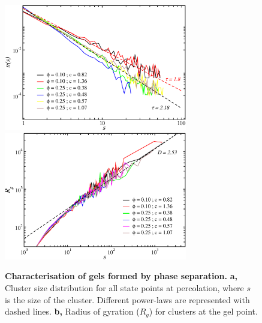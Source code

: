 \documentclass[a4paper,preprint,superscriptaddress]{revtex4}
\begin{document}



\clearpage

\begin{figure}[!t]
 \centering
 \includegraphics[width=8cm,clip]{oldfig/fig1a}
  \includegraphics[width=8cm]{oldfig/fig1b}
 \caption{{\bf Characterisation of gels formed by phase separation.} {\bf a,} 
 Cluster size distribution for all state points at percolation, where $s$ is the size of the cluster. Different power-laws are represented with dashed lines. 
{\bf b,} Radius of gyration ($R_g$) for clusters at the gel point.}
 \label{fig:gel}
\end{figure}

\clearpage
\end{document}
